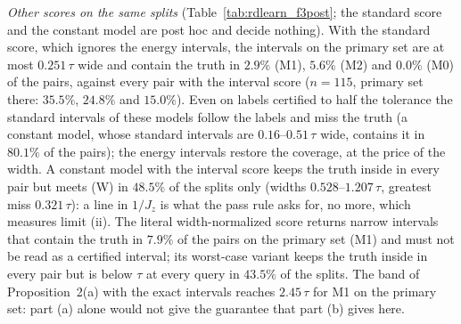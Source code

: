 \documentclass[aps,prx,onecolumn,10pt,nofootinbib,longbibliography,floatfix]{revtex4-2}
\theoremstyle{remark}
\newcommand{\Jz}{J_z}
\begin{document}
\emph{Other scores on the same splits} (Table~\ref{tab:rdlearn_f3post}; the standard score and the constant model
are post hoc and decide nothing). With the standard score, which ignores the energy intervals, the intervals on the
primary set are at most $0.251\,\tau$ wide and contain the truth in $2.9\%$ (M1), $5.6\%$ (M2) and $0.0\%$ (M0) of %
the pairs, against every pair with the interval score ($n=115$, primary set there: $35.5\%$, $24.8\%$ and %
$15.0\%$). Even on labels certified to half the tolerance the standard intervals of these models follow the labels and miss the %
truth (a constant model, whose standard intervals are $0.16$--$0.51\,\tau$ wide, contains it in $80.1\%$ of the %
pairs); the energy intervals restore the coverage, at the price of the width. A constant model with the interval
score keeps the truth inside in every pair but meets (W) in $48.5\%$ of the splits only (widths %
$0.528$--$1.207\,\tau$, greatest miss $0.321\,\tau$): a line in $1/\Jz$ is what the pass rule asks for, no more, %
which measures limit (ii). The literal width-normalized score returns narrow intervals that contain the truth in
$7.9\%$ of the pairs on the primary set (M1) and must not be read as a certified interval; its worst-case variant %
keeps the truth inside in every pair but is below $\tau$ at every query in $43.5\%$ of the splits. The band of %
Proposition~2(a) with the exact intervals reaches $2.45\,\tau$ for M1 on the primary set: part (a) alone would not %
give the guarantee that part (b) gives here.
\end{document}
